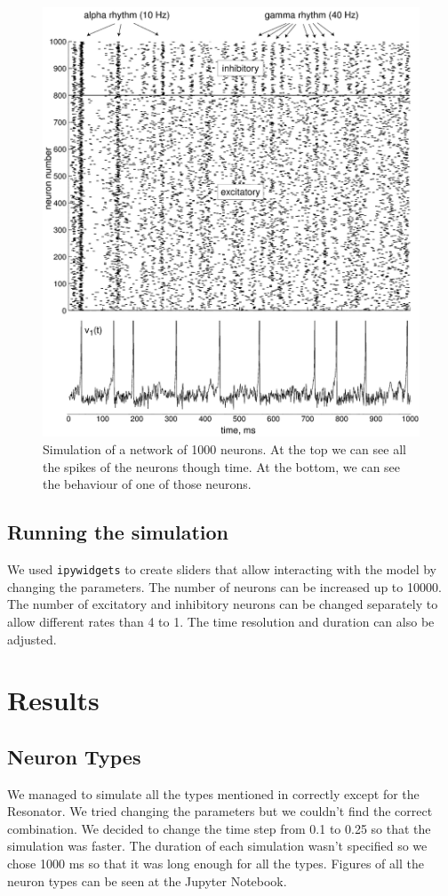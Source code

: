 \documentclass{article} %
\begin{document}
\begin{figure}[ht]
    \centering
    \includegraphics[width=\linewidth]{simulation.png}
    \caption{Simulation of a network of 1000 neurons. At the top we can see all the spikes of the neurons though time. At the bottom, we can see the behaviour of one of those neurons.}
    \label{fig:simulation}
\end{figure}

\subsection{Running the simulation}
We used \texttt{ipywidgets} to create sliders that allow interacting with the model by changing the parameters. The number of neurons can be increased up to 10000. The number of excitatory and inhibitory neurons can be changed separately to allow different rates than 4 to 1. The time resolution and duration can also be adjusted.

\section{Results}

\subsection{Neuron Types}
We managed to simulate all the types mentioned in \cite{Izhikevich2003Simple} correctly except for the Resonator. We tried changing the parameters but we couldn't find the correct combination. We decided to change the time step from 0.1 to 0.25 so that the simulation was faster. The duration of each simulation wasn't specified so we chose 1000 ms so that it was long enough for all the types. Figures of all the neuron types can be seen at the Jupyter Notebook.
\end{document}
